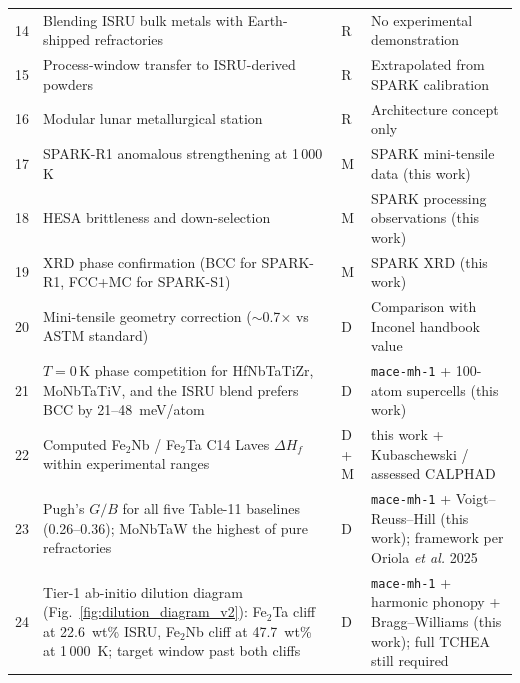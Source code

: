 \documentclass[11pt,a4paper]{article}
\begin{document}
\begin{landscape}
\begin{table}[p]
\begin{tabular}{clll}
14 & Blending ISRU bulk metals with Earth-shipped refractories & R & No experimental demonstration \\
15 & Process-window transfer to ISRU-derived powders & R & Extrapolated from SPARK calibration \\
16 & Modular lunar metallurgical station & R & Architecture concept only \\
17 & SPARK-R1 anomalous strengthening at 1\,000\,K & M & SPARK mini-tensile data (this work) \\
18 & HESA brittleness and down-selection & M & SPARK processing observations (this work) \\
19 & XRD phase confirmation (BCC for SPARK-R1, FCC+MC for SPARK-S1) & M & SPARK XRD (this work) \\
20 & Mini-tensile geometry correction ($\sim$0.7$\times$ vs ASTM standard) & D & Comparison with Inconel handbook value \\
21 & $T = 0$\,K phase competition for HfNbTaTiZr, MoNbTaTiV, and the ISRU blend prefers BCC by 21--48~meV/atom & D & \texttt{mace-mh-1} + 100-atom supercells (this work) \\
22 & Computed Fe$_2$Nb / Fe$_2$Ta C14 Laves $\Delta H_f$ within experimental ranges & D + M & this work + Kubaschewski / assessed CALPHAD \\
23 & Pugh's $G/B$ for all five Table-11 baselines (0.26--0.36); MoNbTaW the highest of pure refractories & D & \texttt{mace-mh-1} + Voigt--Reuss--Hill (this work); framework per Oriola \emph{et al.} 2025 \\
24 & Tier-1 ab-initio dilution diagram (Fig.~\ref{fig:dilution_diagram_v2}): Fe$_2$Ta cliff at 22.6~wt\% ISRU, Fe$_2$Nb cliff at 47.7~wt\% at 1\,000~K; target window past both cliffs & D & \texttt{mace-mh-1} + harmonic phonopy + Bragg--Williams (this work); full TCHEA still required \\
\bottomrule
\end{tabular}
\end{table}
\end{landscape}
\end{document}
